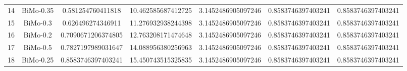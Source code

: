 \documentclass[a4paper,10pt]{article}
\begin{document}
\begin{landscape}
\begin{table}[!htp]
\begin{tabular}{ccccccc}
14&BiMo-0.35&0.581254760411818&10.462585687412725&3.1452486905097246&0.8583746397403241&0.8583746397403241\\
15&BiMo-0.3&0.626496274346911&11.276932938244398&3.1452486905097246&0.8583746397403241&0.8583746397403241\\
16&BiMo-0.2&0.7090671206374805&12.763208171474648&3.1452486905097246&0.8583746397403241&0.8583746397403241\\
17&BiMo-0.5&0.7827197989031647&14.088956380256963&3.1452486905097246&0.8583746397403241&0.8583746397403241\\
18&BiMo-0.25&0.8583746397403241&15.450743515325835&3.1452486905097246&0.8583746397403241&0.8583746397403241\\
\hline
\end{tabular}
\end{table}


\end{landscape}
\end{document}
